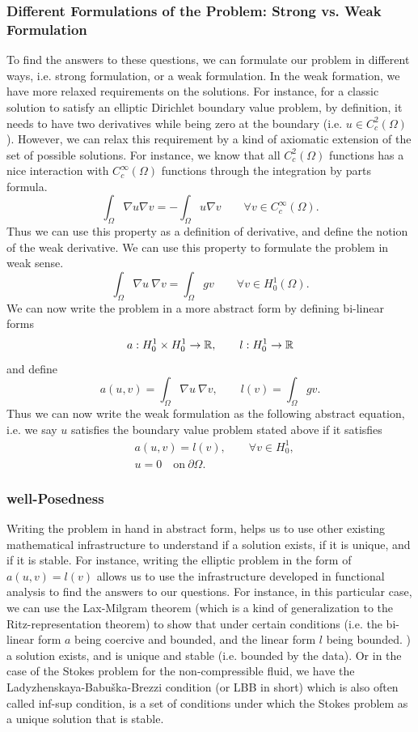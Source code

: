 \subsubsection{Different Formulations of the Problem: Strong vs. Weak Formulation}
To find the answers to these questions, we can formulate our problem in different ways, i.e. strong formulation, or a weak formulation. In the weak formation, we have more relaxed requirements on the solutions. For instance, for a classic solution to satisfy an elliptic Dirichlet boundary value problem, by definition, it needs to have two derivatives while being zero at the boundary (i.e. $ u \in C_c^2(\Omega) $). However, we can relax this requirement by a kind of axiomatic extension of the set of possible solutions. For instance, we know that all $ C_c^2(\Omega) $ functions has a nice interaction with $ C_c^\infty(\Omega) $ functions through the integration by parts formula.
\[ \int_\Omega \nabla u \nabla v = -\int_\Omega u \nabla v \qquad \forall v \in C_c^\infty (\Omega).  \]
Thus we can use this property as a definition of derivative, and define the notion of the weak derivative. We can use this property to formulate the problem in weak sense. 
\[ \int_\Omega \nabla u \ \nabla v = \int_\Omega g v \qquad \forall v \in H_0^1(\Omega). \]
We can now write the problem in a more abstract form by defining bi-linear forms
\[ a: H_0^1 \times H_0^1 \to \mathbb{R}, \qquad l:H_0^1 \to \mathbb{R} \] 
and define 
\[ a(u,v) = \int_\Omega \nabla u\  \nabla v, \qquad l(v) = \int_\Omega gv. \]
Thus we can now write the weak formulation as the following abstract equation, i.e. we say $ u $ satisfies the boundary value problem stated above if it satisfies
\begin{align*}
	&a(u,v)  = l(v), \qquad \forall v \in H_0^1,\\
	&u = 0 \quad \text{on}\ \partial \Omega.
\end{align*}

\subsubsection{well-Posedness}
Writing the problem in hand in abstract form, helps us to use other existing mathematical infrastructure to understand if a solution exists, if it is unique, and if it is stable. For instance, writing the elliptic problem in the form of $ a(u,v) = l(v) $ allows us to use the infrastructure developed in functional analysis to find the answers to our questions. For instance, in this particular case, we can use the Lax-Milgram theorem (which is a kind of generalization to the Ritz-representation theorem) to show that under certain conditions (i.e. the bi-linear form $ a $ being coercive and bounded, and the linear form $ l $ being bounded. ) a solution exists, and is unique and stable (i.e. bounded by the data). Or in the case of the Stokes problem for the non-compressible fluid, we have the  Ladyzhenskaya-Babuška-Brezzi condition (or LBB in short) which is also often called inf-sup condition, is a set of conditions under which the Stokes problem as a unique solution that is stable. 

